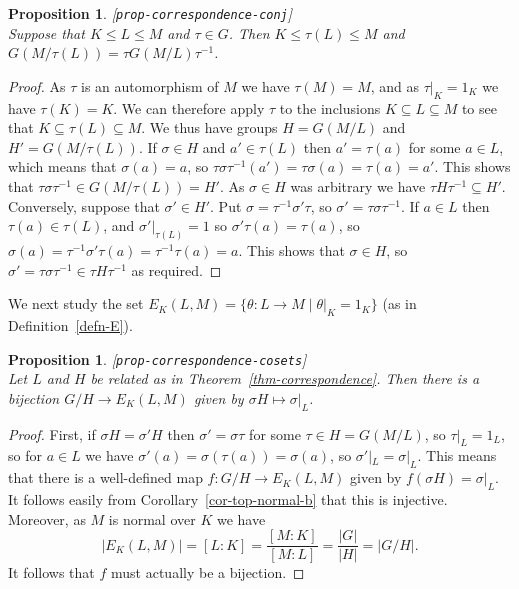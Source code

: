 \documentclass{amsart}
\newcommand{\lbl}[1]{\label{#1}\textup{[\texttt{#1}]}\ \\}
\newcommand{\lbl}{\label}
\newcommand{\tht}       {\theta}
\newcommand{\sg}        {\sigma}
\newcommand{\st}        {\;|\;}
\newcommand{\sse}       {\subseteq}
\renewcommand{\:}{\colon}
\newtheorem{proposition}[theorem]{Proposition}
\theoremstyle{definition}
\begin{document}
\begin{proposition}\lbl{prop-correspondence-conj}
 Suppose that $K\leq L\leq M$ and $\tau\in G$.  Then
 $K\leq\tau(L)\leq M$ and $G(M/\tau(L))=\tau G(M/L)\tau^{-1}$.
\end{proposition}
\begin{proof}
 As $\tau$ is an automorphism of $M$ we have $\tau(M)=M$, and as
 $\tau|_K=1_K$ we have $\tau(K)=K$.  We can therefore apply $\tau$ to
 the inclusions $K\sse L\sse M$ to see that $K\sse\tau(L)\sse M$.  We
 thus have groups $H=G(M/L)$ and $H'=G(M/\tau(L))$.  If $\sg\in H$ and
 $a'\in\tau(L)$ then $a'=\tau(a)$ for some $a\in L$, which means that
 $\sg(a)=a$, so $\tau\sg\tau^{-1}(a')=\tau\sg(a)=\tau(a)=a'$.  This
 shows that $\tau\sg\tau^{-1}\in G(M/\tau(L))=H'$.  As $\sg\in H$ was
 arbitrary we have $\tau H\tau^{-1}\sse H'$.  Conversely, suppose that
 $\sg'\in H'$.  Put $\sg=\tau^{-1}\sg'\tau$, so
 $\sg'=\tau\sg\tau^{-1}$.  If $a\in L$ then $\tau(a)\in \tau(L)$, and
 $\sg'|_{\tau(L)}=1$ so $\sg'\tau(a)=\tau(a)$, so
 $\sg(a)=\tau^{-1}\sg'\tau(a)=\tau^{-1}\tau(a)=a$.  This shows that
 $\sg\in H$, so $\sg'=\tau\sg\tau^{-1}\in\tau H\tau^{-1}$ as
 required.  
\end{proof}

We next study the set $E_K(L,M)=\{\tht\:L\to M\st\tht|_K=1_K\}$ (as in
Definition~\ref{defn-E}). 

\begin{proposition}\lbl{prop-correspondence-cosets}
 Let $L$ and $H$ be related as in Theorem~\ref{thm-correspondence}.
 Then there is a bijection $G/H\to E_K(L,M)$ given by
 $\sg H\mapsto \sg|_L$.
\end{proposition}
\begin{proof}
 First, if $\sg H=\sg' H$ then $\sg'=\sg\tau$ for some
 $\tau\in H=G(M/L)$, so $\tau|_L=1_L$, so for $a\in L$ we have
 $\sg'(a)=\sg(\tau(a))=\sg(a)$, so $\sg'|_L=\sg|_L$.  This means that
 there is a well-defined map $f\:G/H\to E_K(L,M)$ given by
 $f(\sg H)=\sg|_L$.  It follows easily from
 Corollary~\ref{cor-top-normal-b} that this is injective.  Moreover,
 as $M$ is normal over $K$ we have 
 \[ |E_K(L,M)| = [L:K] = \frac{[M:K]}{[M:L]} = 
     \frac{|G|}{|H|} = |G/H|.
 \]
 It follows that $f$ must actually be a bijection.
\end{proof}
\end{document}
